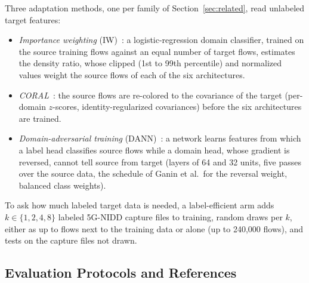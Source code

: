 Three adaptation methods, one per family of Section~\ref{sec:related}, read unlabeled target features:
\begin{itemize}
\item \emph{Importance weighting} (IW)~\cite{shimodaira2000improving,bickel2009discriminative}: a logistic-regression domain classifier, trained on the source training flows against an equal number of target flows, estimates the density ratio, whose clipped (1st to 99th percentile) and normalized values weight the source flows of each of the six architectures.
\item \emph{CORAL}~\cite{sun2016coral}: the source flows are re-colored to the covariance of the target (per-domain $z$-scores, identity-regularized covariances) before the six architectures are trained.
\item \emph{Domain-adversarial training} (DANN)~\cite{ganin2016dann}: a network learns features from which a label head classifies source flows while a domain head, whose gradient is reversed, cannot tell source from target (layers of 64 and 32 units, five passes over the source data, the schedule of Ganin et al.\ for the reversal weight, balanced class weights).
\end{itemize}
To ask how much labeled target data is needed, a label-efficient arm adds $k \in \{1, 2, 4, 8\}$ labeled 5G-NIDD capture files to training, \RLeDraws{} random draws per $k$, either as up to \RLeNtgt{} flows next to the \DA{} training data or alone (up to 240,000 flows), and tests on the capture files not drawn.

\subsection{Evaluation Protocols and References}
\label{sec:protocols}

